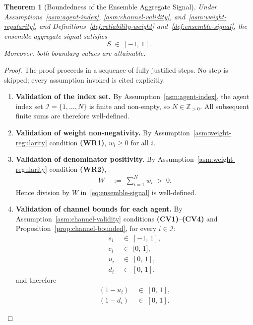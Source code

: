 \documentclass[12pt,openany]{book}
\numberwithin{equation}{chapter}
\theoremstyle{plain}
\newtheorem{theorem}{Theorem}[chapter]
\theoremstyle{definition}
\theoremstyle{remark}
\numberwithin{equation}{chapter}
\theoremstyle{plain}
\begin{document}
\begin{theorem}[Boundedness of the Ensemble Aggregate Signal]
\label{thm:ensemble-bounded}
Under Assumptions~\ref{asm:agent-index},
\ref{asm:channel-validity}, and~\ref{asm:weight-regularity},
and Definitions~\ref{def:reliability-weight}
and~\ref{def:ensemble-signal}, the ensemble aggregate signal
satisfies
\begin{equation}
  S \;\in\; [-1,\,1].
  \label{eq:S-in-unit}
\end{equation}
Moreover, both boundary values are attainable.
\end{theorem}

\begin{proof}
The proof proceeds in a sequence of fully justified steps.
No step is skipped; every assumption invoked is cited explicitly.

\begin{enumerate}

  \item \textbf{Validation of the index set.}
        By Assumption~\ref{asm:agent-index}, the agent index set
        $\mathcal{I} = \{1,\ldots,N\}$ is finite and non-empty,
        so $N \in \mathbb{Z}_{>0}$.
        All subsequent finite sums are therefore well-defined.

  \item \textbf{Validation of weight non-negativity.}
        By Assumption~\ref{asm:weight-regularity} condition
        \textbf{(WR1)}, $w_i \geq 0$ for all $i$.

  \item \textbf{Validation of denominator positivity.}
        By Assumption~\ref{asm:weight-regularity} condition
        \textbf{(WR2)},
        \begin{align}
          W \;&:=\; \sum_{i=1}^{N} w_i \;>\; 0.
          \label{eq:W-pos}
        \end{align}
        Hence division by $W$ in~\eqref{eq:ensemble-signal} is
        well-defined.

  \item \textbf{Validation of channel bounds for each agent.}
        By Assumption~\ref{asm:channel-validity} conditions
        \textbf{(CV1)}--\textbf{(CV4)} and
        Proposition~\ref{prop:channel-bounded}, for every
        $i \in \mathcal{I}$:
        \begin{align}
          s_i     &\;\in\; [-1,\,1],
          \label{eq:s-bound-recall}\\
          c_i     &\;\in\; (0,\,1],
          \label{eq:c-bound-recall}\\
          u_i     &\;\in\; [0,\,1],
          \label{eq:u-bound-recall}\\
          d_i     &\;\in\; [0,\,1],
          \label{eq:d-bound-recall}
        \end{align}
        and therefore
        \begin{align}
          (1-u_i) &\;\in\; [0,\,1],
          \label{eq:1mu-bound}\\
          (1-d_i) &\;\in\; [0,\,1].
          \label{eq:1md-bound}
        \end{align}


\end{enumerate}
\end{proof}
\end{document}
